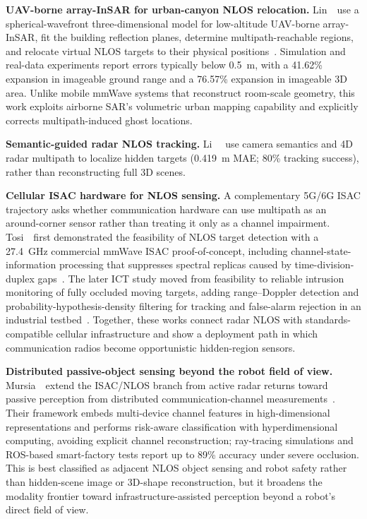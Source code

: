 \vspace{0.8mm}
\noindent \textbf{UAV-borne array-InSAR for urban-canyon NLOS relocation.}
Lin~\etal~use a spherical-wavefront three-dimensional model for low-altitude UAV-borne array-InSAR, fit the building reflection planes, determine multipath-reachable regions, and relocate virtual NLOS targets to their physical positions~\cite{linArrayInSARNLOSTargetRelocation2024}. Simulation and real-data experiments report errors typically below 0.5~m, with a 41.62\% expansion in imageable ground range and a 76.57\% expansion in imageable 3D area. Unlike mobile mmWave systems that reconstruct room-scale geometry, this work exploits airborne SAR's volumetric urban mapping capability and explicitly corrects multipath-induced ghost locations.

\vspace{0.8mm}
\noindent \textbf{Semantic-guided radar NLOS tracking.}
Li~\etal~\cite{liSGNLOSTrack2025} use camera semantics and 4D radar multipath to localize hidden targets (0.419~m MAE; 80\% tracking success), rather than reconstructing full 3D scenes.

\vspace{0.8mm}
\noindent \textbf{Cellular ISAC hardware for NLOS sensing.}
A complementary 5G/6G ISAC trajectory asks whether communication hardware can use multipath as an around-corner sensor rather than treating it only as a channel impairment. Tosi~\etal~first demonstrated the feasibility of NLOS target detection with a 27.4~GHz commercial mmWave ISAC proof-of-concept, including channel-state-information processing that suppresses spectral replicas caused by time-division-duplex gaps~\cite{tosiFeasibilityISACNLOS2024}. The later ICT study moved from feasibility to reliable intrusion monitoring of fully occluded moving targets, adding range--Doppler detection and probability-hypothesis-density filtering for tracking and false-alarm rejection in an industrial testbed~\cite{tosiReliableISACNLOS2026}. Together, these works connect radar NLOS with standards-compatible cellular infrastructure and show a deployment path in which communication radios become opportunistic hidden-region sensors.

\vspace{0.8mm}
\noindent \textbf{Distributed passive-object sensing beyond the robot field of view.}
Mursia~\etal~extend the ISAC/NLOS branch from active radar returns toward passive perception from distributed communication-channel measurements~\cite{mursiaDistributedHDCNLOS2026}. Their framework embeds multi-device channel features in high-dimensional representations and performs risk-aware classification with hyperdimensional computing, avoiding explicit channel reconstruction; ray-tracing simulations and ROS-based smart-factory tests report up to 89\% accuracy under severe occlusion. This is best classified as adjacent NLOS object sensing and robot safety rather than hidden-scene image or 3D-shape reconstruction, but it broadens the modality frontier toward infrastructure-assisted perception beyond a robot's direct field of view.

